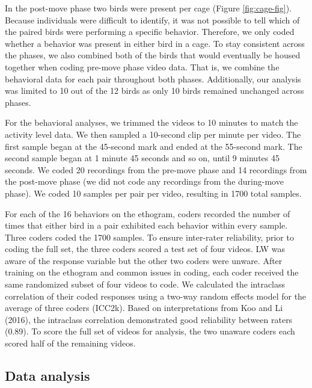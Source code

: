 \documentclass[
  pub]{apa6}
\begin{document}
In the post-move phase two birds were present per cage (Figure \ref{fig:cage-fig}). Because individuals were difficult to identify, it was not possible to tell which of the paired birds were performing a specific behavior. Therefore, we only coded whether a behavior was present in either bird in a cage. To stay consistent across the phases, we also combined both of the birds that would eventually be housed together when coding pre-move phase video data. That is, we combine the behavioral data for each pair throughout both phases. Additionally, our analysis was limited to 10 out of the 12 birds as only 10 birds remained unchanged across phases.

For the behavioral analyses, we trimmed the videos to 10 minutes to match the activity level data. We then sampled a 10-second clip per minute per video. The first sample began at the 45-second mark and ended at the 55-second mark. The second sample began at 1 minute 45 seconds and so on, until 9 minutes 45 seconds. We coded 20 recordings from the pre-move phase and 14 recordings from the post-move phase (we did not code any recordings from the during-move phase). We coded 10 samples per pair per video, resulting in 1700 total samples.

For each of the 16 behaviors on the ethogram, coders recorded the number of times that either bird in a pair exhibited each behavior within every sample. Three coders coded the 1700 samples. To ensure inter-rater reliability, prior to coding the full set, the three coders scored a test set of four videos. LW was aware of the response variable but the other two coders were unware. After training on the ethogram and common issues in coding, each coder received the same randomized subset of four videos to code. We calculated the intraclass correlation of their coded responses using a two-way random effects model for the average of three coders (ICC2k). Based on interpretations from Koo and Li (2016), the intraclass correlation demonstrated good reliability between raters (0.89). To score the full set of videos for analysis, the two unaware coders each scored half of the remaining videos.

\hypertarget{data-analysis}{%
\subsection{Data analysis}\label{data-analysis}}
\end{document}
